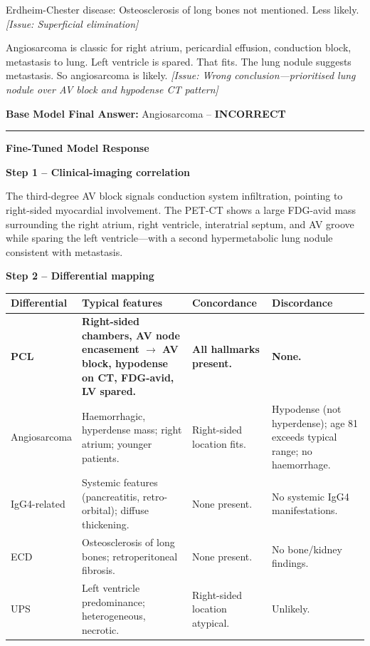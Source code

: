 \documentclass[10pt,journal,compsoc, onecolumn]{IEEEtran}
\begin{document}
\begin{casebox}
    \vspace{0.5em}
    Erdheim-Chester disease: Osteosclerosis of long bones not mentioned. Less likely. \textit{[Issue: Superficial elimination]}

    \vspace{0.5em}
    Angiosarcoma is classic for right atrium, pericardial effusion, conduction block, metastasis to lung. Left ventricle is spared. That fits. The lung nodule suggests metastasis. So angiosarcoma is likely. \textit{[Issue: Wrong conclusion---prioritised lung nodule over AV block and hypodense CT pattern]}

    \vspace{1em}
    \noindent\textbf{Base Model Final Answer:} \colorbox{red!30}{Angiosarcoma} -- \textbf{INCORRECT}

    \vspace{1em}
    \hrule
    \vspace{1em}

    \textbf{Fine-Tuned Model Response}

    \vspace{0.5em}
    \noindent\textbf{Step 1 -- Clinical-imaging correlation}

    \colorbox{yellow!30}{The third-degree AV block signals conduction system infiltration}, pointing to right-sided myocardial involvement. The PET-CT shows a large FDG-avid mass surrounding the right atrium, right ventricle, interatrial septum, and AV groove while sparing the left ventricle---with a second hypermetabolic lung nodule consistent with metastasis.

    \vspace{0.5em}
    \noindent\textbf{Step 2 -- Differential mapping}

    \renewcommand{\arraystretch}{1.4}
    \setlength{\tabcolsep}{6pt}
    {\footnotesize
    \begin{tabular}{|>{\raggedright\arraybackslash}p{2.5cm}|>{\raggedright\arraybackslash}p{4.0cm}|>{\raggedright\arraybackslash}p{3.0cm}|>{\raggedright\arraybackslash}p{2.5cm}|}
    \hline
    \textbf{Differential} & \textbf{Typical features} & \textbf{Concordance} & \textbf{Discordance} \\
    \hline
    \textbf{PCL} & \textbf{Right-sided chambers, AV node encasement $\to$ AV block, hypodense on CT, FDG-avid, LV spared.} & \textbf{All hallmarks present.} & \textbf{None.} \\
    \hline
    Angiosarcoma & Haemorrhagic, hyperdense mass; right atrium; younger patients. & Right-sided location fits. & Hypodense (not hyperdense); age 81 exceeds typical range; no haemorrhage. \\
    \hline
    IgG4-related & Systemic features (pancreatitis, retro-orbital); diffuse thickening. & None present. & No systemic IgG4 manifestations. \\
    \hline
    ECD & Osteosclerosis of long bones; retroperitoneal fibrosis. & None present. & No bone/kidney findings. \\
    \hline
    UPS & Left ventricle predominance; heterogeneous, necrotic. & Right-sided location atypical. & Unlikely. \\
    \hline
    \end{tabular}
    }


\end{casebox}
\end{document}
